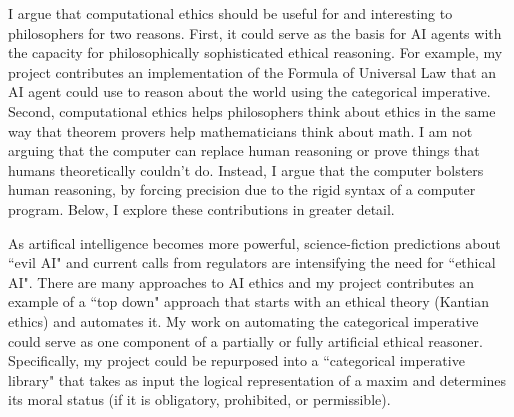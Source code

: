 %
\begin{isabellebody}%
%
%
\isadelimtheory
%
\endisadelimtheory
%
\isatagtheory
%
\endisatagtheory
{\isafoldtheory}%
%
\isadelimtheory
%
\endisadelimtheory
%
\isadelimdocument
%
\endisadelimdocument
%
\isatagdocument
%
\isamarkuptrue%
%
\endisatagdocument
{\isafolddocument}%
%
\isadelimdocument
%
\endisadelimdocument
%
\begin{isamarkuptext}%
I argue that computational ethics should be useful for and interesting to philosophers for two 
reasons. First, it could serve as the basis for AI agents with the capacity for philosophically sophisticated 
ethical reasoning. For example, my project contributes an implementation of the Formula of Universal Law
that an AI agent could use to reason about the world using the categorical imperative. Second, computational 
ethics helps philosophers think about ethics in the same way that theorem provers help 
mathematicians think about math. I am not arguing that the computer can replace human reasoning or prove things
that humans theoretically couldn't do. Instead, I argue that the computer bolsters human reasoning, by forcing precision due to 
the rigid syntax of a computer program. Below, I explore 
these contributions in greater detail.%
\end{isamarkuptext}\isamarkuptrue%
%
\isadelimdocument
%
\endisadelimdocument
%
\isatagdocument
%
\isamarkuptrue%
%
\endisatagdocument
{\isafolddocument}%
%
\isadelimdocument
%
\endisadelimdocument
%
\begin{isamarkuptext}%
As artifical intelligence becomes more powerful, science-fiction predictions about ``evil AI"
and current calls from regulators are intensifying the need for ``ethical AI". There are many 
approaches to AI ethics and my project contributes an example of a ``top down" approach that starts with 
an ethical theory (Kantian ethics) and automates it. My work on automating the categorical imperative 
could serve as one component of a partially or fully artificial ethical reasoner. Specifically, my 
project could be repurposed into a ``categorical imperative library" that takes as input the logical representation of a maxim 
and determines its moral status (if it is obligatory, prohibited, or permissible).


\end{isamarkuptext}
\end{isabellebody}
